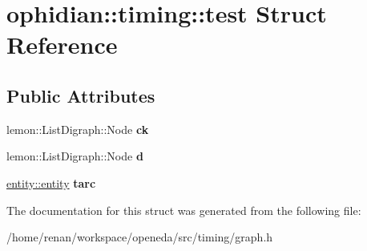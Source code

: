 \hypertarget{structophidian_1_1timing_1_1test}{\section{ophidian\-:\-:timing\-:\-:test Struct Reference}
\label{structophidian_1_1timing_1_1test}
}
\subsection*{Public Attributes}
\begin{DoxyCompactItemize}
\item 
\hypertarget{structophidian_1_1timing_1_1test_afe4e1fb0081480b9ded56d6aef39cf05}{lemon\-::\-List\-Digraph\-::\-Node {\bfseries ck}}\label{structophidian_1_1timing_1_1test_afe4e1fb0081480b9ded56d6aef39cf05}

\item 
\hypertarget{structophidian_1_1timing_1_1test_ac3f29d79152cb953145d5d208581a30e}{lemon\-::\-List\-Digraph\-::\-Node {\bfseries d}}\label{structophidian_1_1timing_1_1test_ac3f29d79152cb953145d5d208581a30e}

\item 
\hypertarget{structophidian_1_1timing_1_1test_ad4b35f9ecfc89f40920ff831932a7c29}{\hyperlink{classophidian_1_1entity_1_1entity}{entity\-::entity} {\bfseries tarc}}\label{structophidian_1_1timing_1_1test_ad4b35f9ecfc89f40920ff831932a7c29}

\end{DoxyCompactItemize}


The documentation for this struct was generated from the following file\-:\begin{DoxyCompactItemize}
\item 
/home/renan/workspace/openeda/src/timing/graph.\-h\end{DoxyCompactItemize}
